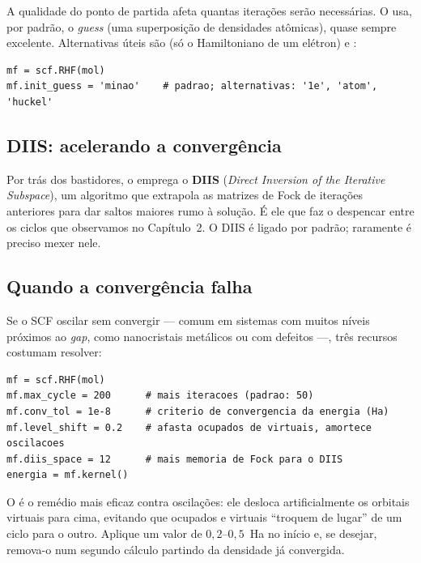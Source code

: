 A qualidade do ponto de partida afeta quantas iterações serão necessárias. O
\pyscf{} usa, por padrão, o \emph{guess}  (uma superposição de
densidades atômicas), quase sempre excelente. Alternativas úteis são  (só
o Hamiltoniano de um elétron) e :

\begin{lstlisting}[style=python,caption={Escolhendo o \emph{guess} inicial.},label={lst:guess}]
mf = scf.RHF(mol)
mf.init_guess = 'minao'    # padrao; alternativas: '1e', 'atom', 'huckel'
\end{lstlisting}

\subsection{DIIS: acelerando a convergência}

Por trás dos bastidores, o \pyscf{} emprega o \textbf{DIIS} (\emph{Direct
Inversion of the Iterative Subspace}), um algoritmo que extrapola as matrizes de
Fock de iterações anteriores para dar saltos maiores rumo à solução. É ele que
faz o  despencar entre os ciclos que observamos no Capítulo~2. O DIIS é
ligado por padrão; raramente é preciso mexer nele.

\subsection{Quando a convergência falha}

Se o SCF oscilar sem convergir --- comum em sistemas com muitos níveis próximos ao
\emph{gap}, como nanocristais metálicos ou com defeitos ---, três recursos costumam
resolver:

\begin{lstlisting}[style=python,caption={Estabilizando um SCF difícil.},label={lst:convfix}]
mf = scf.RHF(mol)
mf.max_cycle = 200      # mais iteracoes (padrao: 50)
mf.conv_tol = 1e-8      # criterio de convergencia da energia (Ha)
mf.level_shift = 0.2    # afasta ocupados de virtuais, amortece oscilacoes
mf.diis_space = 12      # mais memoria de Fock para o DIIS
energia = mf.kernel()
\end{lstlisting}

\begin{caixadica}
O  é o remédio mais eficaz contra oscilações: ele desloca
artificialmente os orbitais virtuais para cima, evitando que ocupados e virtuais
``troquem de lugar'' de um ciclo para o outro. Aplique um valor de $0{,}2$--$0{,}5$~Ha
no início e, se desejar, remova-o num segundo cálculo partindo da densidade já
convergida.
\end{caixadica}

